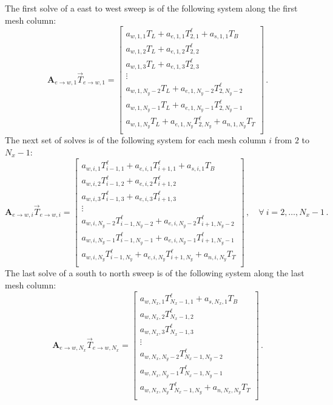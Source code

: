 \documentclass{article}
\begin{document}
The first solve of a east to west sweep is of the following system along the first mesh column:
\begin{equation}
	\label{eq:east_west_1}
	\mathbf{A}_{e\to w, 1} \vec{T}_{e\to w, 1} = 
	\begin{bmatrix}
		a_{w,1,1} T_L + a_{e, 1, 1} T_{2, 1}^\ell + a_{s, 1, 1} T_B \\
		a_{w,1,2} T_L + a_{e, 1, 2} T_{2, 2}^\ell \\
		a_{w,1,3} T_L + a_{e, 1, 3} T_{2, 3}^\ell\\
		\vdots \\
		a_{w,1,N_y - 2} T_L + a_{e, 1, N_y - 2} T_{2, N_y - 2}^\ell \\
		a_{w,1,N_y - 1} T_L + a_{e, 1, N_y - 1} T_{2, N_y - 1}^\ell\\
		a_{w,1,N_y} T_L +  a_{e, 1, N_y} T_{2, N_y}^\ell + a_{n, 1, N_y} T_T \\
	\end{bmatrix}\,.
\end{equation}
The next set of solves is of the following system for each mesh column $i$ from $2$ to $N_x - 1$:
\begin{equation}
	\label{eq:east_west_2}
	\mathbf{A}_{e\to w, i} \vec{T}_{e\to w, i} = 
	\begin{bmatrix}
		a_{w,i,1} T_{i-1, 1}^\ell + a_{e, i, 1} T_{i+1, 1}^\ell + a_{s, i, 1} T_B \\
		a_{w,i,2} T_{i-1, 2}^\ell + a_{e, i, 2} T_{i+1, 2}^\ell \\
		a_{w,i,3} T_{i-1, 3}^\ell + a_{e, i, 3} T_{i+1, 3}^\ell\\
		\vdots \\
		a_{w,i,N_y - 2} T_{i-1, N_y - 2}^\ell + a_{e, i, N_y - 2} T_{i+1, N_y - 2}^\ell \\
		a_{w,i,N_y - 1} T_{i-1, N_y - 1}^\ell + a_{e, i, N_y - 1} T_{i+1, N_y - 1}^\ell\\
		a_{w,i,N_y} T_{i-1, N_y}^\ell + a_{e, i, N_y} T_{i+1, N_y}^\ell + a_{n, i, N_y} T_T \\
	\end{bmatrix}\,, \quad \forall ~ i = 2, \ldots, N_x - 1\,.
\end{equation}
The last solve of a south to north sweep is of the following system along the last mesh column:
\begin{equation}
	\label{eq:east_west_3}
	\mathbf{A}_{e\to w, N_x} \vec{T}_{e\to w, N_x} = 
	\begin{bmatrix}
		a_{w,N_x,1} T_{N_x-1, 1}^\ell + a_{s, N_x, 1} T_B \\
		a_{w,N_x,2} T_{N_x-1, 2}^\ell \\
		a_{w,N_x,3} T_{N_x-1, 3}^\ell \\
		\vdots \\
		a_{w,N_x,N_y - 2} T_{N_x-1, N_y - 2}^\ell \\
		a_{w,N_x,N_y - 1} T_{N_x-1, N_y - 1}^\ell \\
		a_{w,N_x,N_y} T_{N_x-1, N_y}^\ell + a_{n, N_x, N_y} T_T \\
	\end{bmatrix}\,.
\end{equation}
\end{document}
